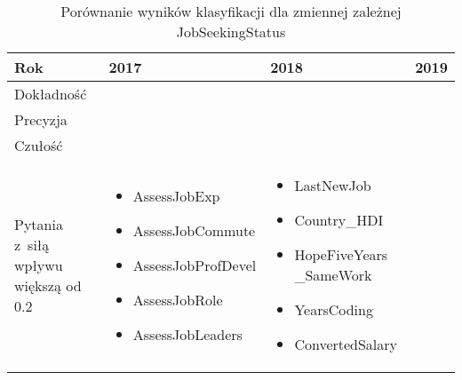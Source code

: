 \noindent\begin{minipage}{\textwidth}
             \begin{table}[H]
                 \raggedright\caption{Porównanie wyników klasyfikacji dla zmiennej zależnej JobSeekingStatus\label{tabela:JobSeekingStatusClassification}}
                 \begin{center}
                     \begin{tabular}{|P{.1\textwidth}|P{.26\textwidth}|P{.26\textwidth}|P{.26\textwidth}|}

                         \hline
                         Rok        & 2017             & 2018           & 2019            \\
                         \hline
                         Dokładność &  &  &  \\
                         \hline
                         Precyzja   &  &  &   \\
                         \hline
                         Czułość    &  &  &   \\
                         \hline
                         Pytania z~siłą wpływu większą od 0.2 &
                         \begin{itemize}
                             \item AssessJobExp
                             \item AssessJobCommute
                             \item AssessJobProfDevel
                             \item AssessJobRole
                             \item AssessJobLeaders
                         \end{itemize} &
                         \begin{itemize}
                             \item LastNewJob
                             \item Country\_HDI
                             \item HopeFiveYears \_SameWork
                             \item YearsCoding
                             \item ConvertedSalary
                         \end{itemize} &
                         \begin{itemize}

\end{itemize}
\end{tabular}
\end{center}
\end{table}
\end{minipage}
